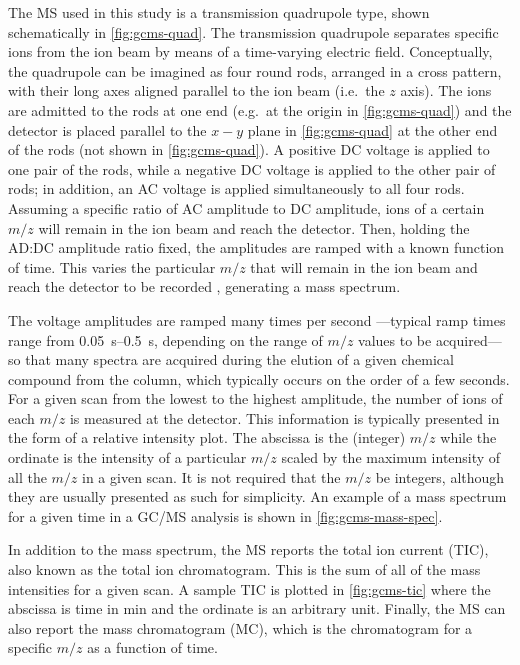 \documentclass[../main.tex]{subfiles}
\begin{document}
The MS used in this study is a transmission quadrupole type, shown
schematically in \cref{fig:gcms-quad}. The transmission quadrupole separates
specific ions from the ion beam by
means of a time-varying electric field. Conceptually, the quadrupole
can be imagined as four round rods, arranged in a cross pattern, with
their long axes aligned parallel to the ion beam (i.e.\ the $z$ axis).
The ions are admitted to the rods at one end (e.g.\ at the origin in
\cref{fig:gcms-quad}) and the detector is placed parallel to the $x-y$ plane
in \cref{fig:gcms-quad} at the other end of the rods (not shown in
\cref{fig:gcms-quad}). A positive DC voltage is applied
to one pair of the rods, while a negative DC voltage is applied to the other
pair of rods; in addition, an AC voltage is applied simultaneously to all four
rods. Assuming a specific ratio of AC amplitude to DC amplitude, ions of a certain
$m/z$ will remain in the ion beam and reach the detector.
Then, holding the AD:DC amplitude ratio fixed, the amplitudes are ramped with a known
function of time. This varies the particular $m/z$ that will remain in the ion beam
and reach the detector to be recorded \cite{Sparkman2011}, generating a mass spectrum.

The voltage amplitudes are ramped many times per second%
---typical ramp times range from \SIrange{0.05}{0.5}{\second},
depending on the range of $m/z$ values to be acquired---so that many
spectra are acquired during the elution of a given chemical compound
from the column, which typically occurs on the order of a few seconds.
For a given scan from the lowest to the highest amplitude, the number of ions
of each $m/z$ is measured at the detector. This information is
typically presented in the form of a relative intensity plot. The abscissa
is the (integer) $m/z$ while the ordinate is the intensity of a particular
$m/z$ scaled by the maximum intensity of all the $m/z$ in a given scan. It
is not required that the $m/z$ be integers, although they are usually presented
as such for simplicity. An example of a mass spectrum for a given time in a
GC/MS analysis is shown in \cref{fig:gcms-mass-spec}.

In addition to the mass spectrum, the MS reports the total ion current (TIC),
also known as the total ion chromatogram. This is the sum of all of the mass
intensities for a given scan. A sample TIC is plotted in \cref{fig:gcms-tic}
where the abscissa is time in \si{\minute} and the ordinate is an arbitrary unit.
Finally, the MS can also report the mass chromatogram (MC), which is the
chromatogram for a specific $m/z$ as a function of time.
\end{document}
